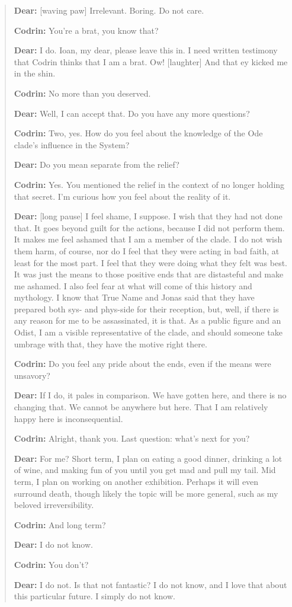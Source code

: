 \begin{quote}
\textbf{Dear:} {[}waving paw{]} Irrelevant. Boring. Do not care.

\textbf{Codrin:} You're a brat, you know that?

\textbf{Dear:} I do. Ioan, my dear, please leave this in. I need written testimony that Codrin thinks that I am a brat. Ow! {[}laughter{]} And that ey kicked me in the shin.

\textbf{Codrin:} No more than you deserved.

\textbf{Dear:} Well, I can accept that. Do you have any more questions?

\textbf{Codrin:} Two, yes. How do you feel about the knowledge of the Ode clade's influence in the System?

\textbf{Dear:} Do you mean separate from the relief?

\textbf{Codrin:} Yes. You mentioned the relief in the context of no longer holding that secret. I'm curious how you feel about the reality of it.

\textbf{Dear:} {[}long pause{]} I feel shame, I suppose. I wish that they had not done that. It goes beyond guilt for the actions, because I did not perform them. It makes me feel ashamed that I am a member of the clade. I do not wish them harm, of course, nor do I feel that they were acting in bad faith, at least for the most part. I feel that they were doing what they felt was best. It was just the means to those positive ends that are distasteful and make me ashamed. I also feel fear at what will come of this history and mythology. I know that True Name and Jonas said that they have prepared both sys- and phys-side for their reception, but, well, if there is any reason for me to be assassinated, it is that. As a public figure and an Odist, I am a visible representative of the clade, and should someone take umbrage with that, they have the motive right there.

\textbf{Codrin:} Do you feel any pride about the ends, even if the means were unsavory?

\textbf{Dear:} If I do, it pales in comparison. We have gotten here, and there is no changing that. We cannot be anywhere but here. That I am relatively happy here is inconsequential.

\textbf{Codrin:} Alright, thank you. Last question: what's next for you?

\textbf{Dear:} For me? Short term, I plan on eating a good dinner, drinking a lot of wine, and making fun of you until you get mad and pull my tail. Mid term, I plan on working on another exhibition. Perhaps it will even surround death, though likely the topic will be more general, such as my beloved irreversibility.

\textbf{Codrin:} And long term?

\textbf{Dear:} I do not know.

\textbf{Codrin:} You don't?

\textbf{Dear:} I do not. Is that not fantastic? I do not know, and I love that about this particular future. I simply do not know.
\end{quote}
